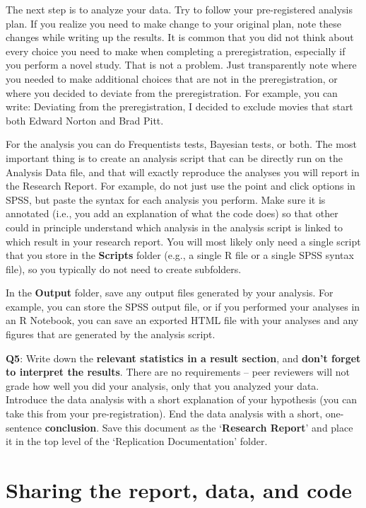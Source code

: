 \documentclass[
  oneside]{krantz}
\begin{document}
The next step is to analyze your data. Try to follow your pre-registered analysis plan. If you realize you need to make change to your original plan, note these changes while writing up the results. It is common that you did not think about every choice you need to make when completing a preregistration, especially if you perform a novel study. That is not a problem. Just transparently note where you needed to make additional choices that are not in the preregistration, or where you decided to deviate from the preregistration. For example, you can write: Deviating from the preregistration, I decided to exclude movies that start both Edward Norton and Brad Pitt.

For the analysis you can do Frequentists tests, Bayesian tests, or both. The most important thing is to create an analysis script that can be directly run on the Analysis Data file, and that will exactly reproduce the analyses you will report in the Research Report. For example, do not just use the point and click options in SPSS, but paste the syntax for each analysis you perform. Make sure it is annotated (i.e., you add an explanation of what the code does) so that other could in principle understand which analysis in the analysis script is linked to which result in your research report. You will most likely only need a single script that you store in the \textbf{Scripts} folder (e.g., a single R file or a single SPSS syntax file), so you typically do not need to create subfolders.

In the \textbf{Output} folder, save any output files generated by your analysis. For example, you can store the SPSS output file, or if you performed your analyses in an R Notebook, you can save an exported HTML file with your analyses and any figures that are generated by the analysis script.

\textbf{Q5}: Write down the \textbf{relevant statistics in a result section}, and \textbf{don't forget to interpret the results}. There are no requirements -- peer reviewers will not grade how well you did your analysis, only that you analyzed your data. Introduce the data analysis with a short explanation of your hypothesis (you can take this from your pre-registration). End the data analysis with a short, one-sentence \textbf{conclusion}. Save this document as the `\textbf{Research Report}' and place it in the top level of the `Replication Documentation' folder.

\hypertarget{sharing-the-report-data-and-code}{%
\section{Sharing the report, data, and code}\label{sharing-the-report-data-and-code}}
\end{document}
